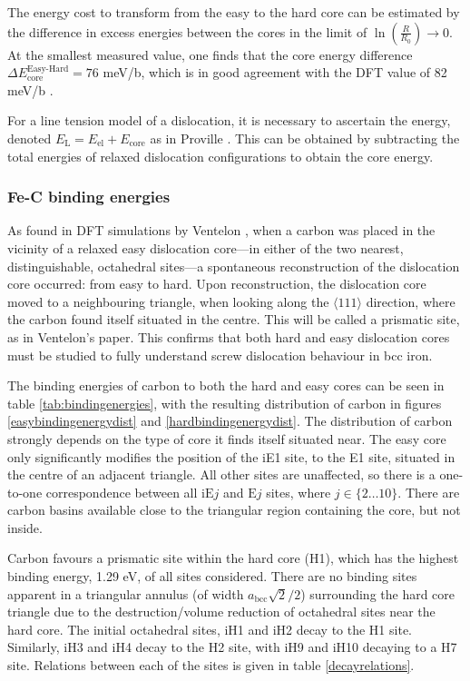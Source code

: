 \documentclass[a4paper,11pt]{article}
\numberwithin{equation}{chapter}
\numberwithin{listing}{chapter}
\begin{document}
The energy cost to transform from the easy to the hard core can be estimated by
the difference in excess energies between the cores in the limit of
\(\ln (\frac{R}{R_0}) \rightarrow 0\). At the smallest measured value, one finds that the core energy
difference \(\Delta E_{\text{core}}^{\text{Easy-Hard}} = 76\) meV/b, which is in good agreement with the DFT
value of 82 meV/b \cite{Itakura2012}.


For a line tension model of a dislocation, it is necessary to
ascertain the energy, denoted \(E_{\text{L}} = E_{\text{el}} + E_{\text{core}}\) as in Proville
\cite{Rodney2009}. This can be obtained by subtracting the total
energies of relaxed dislocation configurations to obtain the core
energy.



\subsubsection{Fe-C binding energies}
\label{sec:orgad2d7e7}
\label{sec:fec_binding}

As found in DFT simulations by Ventelon \cite{Ventelon2015}, when a carbon was placed in the
vicinity of a relaxed easy dislocation core---in either of the two nearest, distinguishable,
octahedral sites---a spontaneous reconstruction of the dislocation core occurred: from easy to
hard. Upon reconstruction, the dislocation core moved to a neighbouring triangle, when looking
along the \(\langle 111\rangle\) direction, where the carbon found itself situated in the centre. This will be
called a prismatic site, as in Ventelon's paper. This confirms that both hard and easy
dislocation cores must be studied to fully understand screw dislocation behaviour in bcc iron.


The binding energies of carbon to both the hard and easy cores can be seen in table
\ref{tab:bindingenergies}, with the resulting distribution of carbon in figures
\ref{easybindingenergydist} and \ref{hardbindingenergydist}. The distribution of carbon strongly
depends on the type of core it finds itself situated near. The easy core only significantly
modifies the position of the iE1 site, to the E1 site, situated in the centre of an adjacent
triangle. All other sites are unaffected, so there is a one-to-one correspondence between all
\(\text{iE}j\) and \(\text{E}j\) sites, where \(j \in \{2\dots10\}\). There are carbon basins available close
to the triangular region containing the core, but not inside.

Carbon favours a prismatic site within the hard core (H1), which has the highest
binding energy, 1.29 eV, of all sites considered. There are no binding sites apparent in a triangular
annulus (of width \(a_{\text{bcc}}\sqrt{2}/2\)) surrounding the hard core triangle due to the
destruction/volume reduction of octahedral sites near the hard core. The initial octahedral
sites, iH1 and iH2 decay to the H1 site. Similarly, iH3 and iH4 decay to the H2 site, with iH9
and iH10 decaying to a H7 site. Relations between each of the sites is given in table
\ref{decayrelations}.
\end{document}
